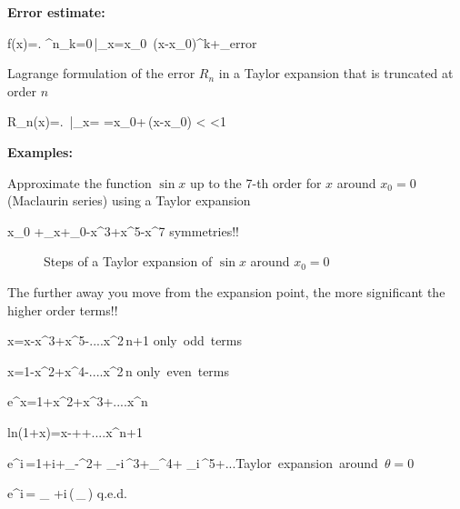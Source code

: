 {\bf Error estimate:}

\bnn
    f(x)=\left. \sum^n_{k=0}\,\right|_{x=x_0} \,(x-x_0)^k+_{\mbox{error}}
\enn



Lagrange formulation of the error $R_n$ in a Taylor expansion that is truncated at order $n$

\bnn
    R_n(x)=\left. \,\right|_{x=\xi} \qquad
    \xi=x_0+\delta\,(x-x_0) < \delta <1
\enn \vs



{\bf Examples:}



Approximate the  function $\sin x$ up to the 7-th order for $x$ around $x_0=0$ (Maclaurin series) using a Taylor expansion

\bnn
    \sin x\approx {}_{0}\; +\;_{x}\;+\;_{0}\;-\;\;x^{3}\;+\;\;x^{5}-\;\;x^{7} \qquad
    \mbox{symmetries!!}
\enn

\begin{figure}[!ht]

    \centerline{\epsfxsize=10cm  }

    \caption{Steps of a Taylor expansion of $\sin x$ around $x_0=0$}  \label{fig59}

\end{figure} \svs

The further away you move from the expansion point, the more significant the higher order terms!!


\bnn
\sin x=x-\;\;x^3\;+\;\;x^5-\;....\;\;x^{2\,n+1} \qquad \mbox{only odd terms}
\enn

\bnn
\cos x=1-\;\;x^2\;+\;\;x^4-\;....\;\;x^{2\,n} \qquad\qquad \mbox{only even terms}
\enn

\bnn e^{x}=1+\;\;x^2\;+\;\;x^3\;+\;....\;\;x^n \enn

\bnn  \mbox{ln}(1+x)=x-\;\;+\;\;+\;....\;\;x^{n+1}  \enn



\bnn e^{i\,\theta}=1+i\theta +_{-\theta^2}+ _{-i\,\theta^3}+_{\theta^4}+
_{i\,\theta^5}+...\qquad\mbox{Taylor expansion around $\theta=0$}
\enn

\bnn
  \Rightarrow \qquad e^{i\,\theta}= _{\cos\theta} \quad
    +i\,(\,_{\sin\theta}\,) \qquad\mbox{q.e.d.}
\enn



